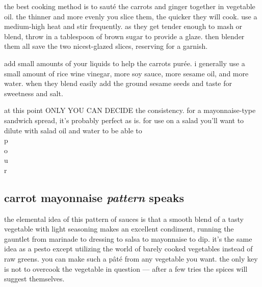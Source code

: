 the best cooking method is to saut\'{e} the carrots and ginger together in 
vegetable oil. the thinner and more evenly you slice them, the quicker they 
will cook. use a medium-high heat and stir frequently. as they get tender 
enough to mash or blend, throw in a tablespoon of brown sugar to provide a 
glaze. then blender them all save the two nicest-glazed slices, reserving for 
a garnish. 

add small amounts of your liquids to help the carrots pur\'{e}e. i generally 
use a small amount of rice wine vinegar, more soy sauce, more sesame oil, and 
more water. when they blend easily add the ground sesame seeds and taste for 
sweetness and salt.

\begin{minipage}{\textwidth}
at this point ONLY YOU CAN DECIDE the consistency. for a mayonnaise-type 
sandwich spread, it's probably perfect as is. for use on a salad you'll want 
to dilute with salad oil and water to be able to\\
p\\
\makebox[1ex]{}o\\
\makebox[1.5ex]{}u\\
\makebox[1.8ex]{}r
\end{minipage}

\subsection{carrot mayonnaise \textit{pattern} speaks}

the elemental idea of this pattern of sauces is that a smooth blend of a tasty 
vegetable with light seasoning makes an excellent condiment, running the 
gauntlet from marinade to dressing to salsa to mayonnaise to dip. it's the 
same idea as a pesto except utilizing the world of barely cooked vegetables 
instead of raw greens. you can make such a p\^{a}t\'{e} from any vegetable you 
want. the only key is not to overcook the vegetable in question --- after a 
few tries the spices will suggest themselves.

